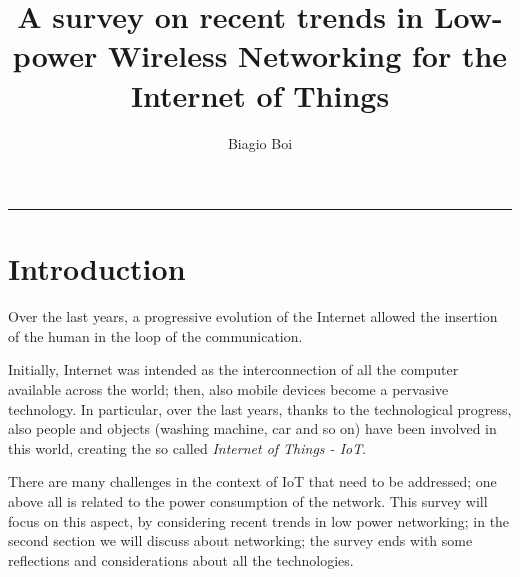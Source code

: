 \documentclass[sigconf]{acmart}
\begin{document}
    \title{A survey on recent trends in Low-power Wireless Networking for the Internet of Things}

    \author{Biagio Boi}

   

    \begin{teaserfigure}
        \rule{\linewidth}{1mm}
    \end{teaserfigure}

    \maketitle


    \section{Introduction}
    Over the last years, a progressive evolution of the Internet allowed the insertion of the human in the loop of the communication. 
    
    Initially, Internet was intended as the interconnection of all the computer available across the world; then, also mobile devices become a pervasive technology. In particular, over the last years, thanks to the technological progress, also people and objects (washing machine, car and so on) have been involved in this world, creating the so called \textit{Internet of Things - IoT}. 
    
    There are many challenges in the context of IoT that need to be addressed; one above all is related to the power consumption of the network. This survey will focus on this aspect, by considering recent trends in low power networking; in the second section we will discuss about networking; the survey ends with some reflections and considerations about all the technologies.
    
\end{document}
